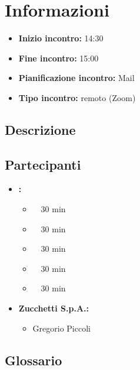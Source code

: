 \section{Informazioni}
\begin{itemize}
	\item \textbf{Inizio incontro:} 14:30
	\item \textbf{Fine incontro:} 15:00
	\item \textbf{Pianificazione incontro:} Mail
	\item \textbf{Tipo incontro:} remoto (Zoom)
\end{itemize}

\subsection{Descrizione}
\DocDescription

\subsection{Partecipanti}

\begin{itemize}
	\item \textbf{\GroupName:}
	\begin{itemize}
		\item \tommaso \ \rightarrow\ 30 min
		\item \riccardo \ \rightarrow\ 30 min
		\item \raul \ \rightarrow\ 30 min 
		\item \martina \ \rightarrow\ 30 min 
		\item \sebastiano \ \rightarrow\ 30  min 
	\end{itemize}
	\item \textbf{Zucchetti S.p.A.:}
    \begin{itemize}
        \item Gregorio Piccoli
    \end{itemize}
\end{itemize}

\subsection{Glossario}
\GlossarioIntroduzioneVE

\clearpage